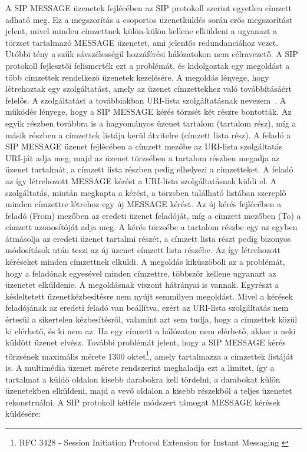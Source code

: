 A SIP MESSAGE üzenetek fejlécében az SIP protokoll szerint egyetlen címzett adható meg. Ez a megszorítás a csoportos üzenetküldés során erős megszorítást jelent, mivel minden címzettnek külön-külön kellene elküldeni a ugyanazt a törzset tartalmazó MESSAGE üzenetet, ami jelentős redundanciához vezet. Utóbbi tény a szűk sávszélességű hozzáférési hálózatokon nem célravezető. A SIP protokoll fejlesztői felismerték ezt a problémát, és kidolgoztak egy megoldást a több címzettek rendelkező üzenetek kezelésére.
A megoldás lényege, hogy létrehoztak egy szolgáltatást, amely az üzenet címzettekhez való továbbításáért felelős. A szolgáltatást a továbbiakban URI-lista szolgáltatásnak nevezem~\cite{rfc5365}. A működés lényege, hogy a SIP MESSAGE kérés törzsét két részre bontották. Az egyik részben továbbra is a hagyományos üzenet tartalom (tartalom rész), míg a másik részben a címzettek listája kerül átvitelre (címzett lista rész). A feladó a SIP MESSAGE üzenet fejlécében a címzett mezőbe az URI-lista szolgáltatás URI-ját adja meg, majd az üzenet törzsében a tartalom részben megadja az üzenet tartalmát, a címzett lista részben pedig elhelyezi a címzetteket. A feladó az így létrehozott MESSAGE kérést a URI-lista szolgáltatásnak küldi el. A szolgáltatás, miután megkapta a kérést, a törzsben található listában szereplő minden címzettre létrehoz egy új MESSAGE kérést. Az új kérés fejlécében a feladó (From) mezőben az eredeti üzenet feladóját, míg a címzett mezőben (To) a címzett azonosítóját adja meg. A kérés törzsébe a tartalom részbe egy az egyben átmásolja az eredeti üzenet tartalmi részét, a címzett lista részt pedig bizonyos módosítások után teszi az új üzenet címzett lista részébe. Az így létrehozott kéréseket minden címzettnek elküldi. A megoldás kiküszöböli az a problémát, hogy a feladónak egyesével minden címzettre, többször kellene ugyanazt az üzenetet elküldenie. A megoldásnak viszont hátrányai is vannak. Egyrészt a késleltetett üzenetkézbesítésre nem nyújt semmilyen megoldást. Mivel a kérések feladójának az eredeti feladó van beállítva, ezért az URI-lista szolgáltatás nem értesül a sikertelen kézbesítésről, valamint azt sem tudja, hogy a címzettek közül ki elérhető, és ki nem az. Ha egy címzett a hálózaton nem elérhető, akkor a neki küldött üzenet elvész. További problémát jelent, hogy a SIP MESSAGE kérés törzsének maximális mérete 1300 oktet\footnote{RFC 3428 - Session Initiation Protocol Extension for Instant Messaging \cite{rfc3428}}, amely tartalmazza a címzettek listáját is. A multimédia üzenet mérete rendszerint meghaladja ezt a limitet, így a tartalmat a küldő oldalon kisebb darabokra kell tördelni, a darabokat külön üzenetekben elküldeni, majd a vevő oldalon a kisebb részekből a teljes üzenetet rekonstruálni. A SIP protokoll kétféle módszert támogat MESSAGE kérések küldésére:

